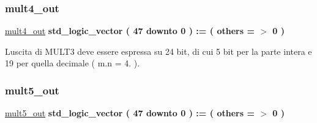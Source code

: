 \subsubsection{\texorpdfstring{mult4\+\_\+out}{mult4\_out}}
{\footnotesize\ttfamily \hyperlink{group___linear_regression_ga5a0832f93305c3e0a37293a00e17a538}{mult4\+\_\+out} {\bfseries \textcolor{vhdlchar}{std\+\_\+logic\+\_\+vector}\textcolor{vhdlchar}{ }\textcolor{vhdlchar}{(}\textcolor{vhdlchar}{ }\textcolor{vhdlchar}{ } \textcolor{vhdldigit}{47} \textcolor{vhdlchar}{ }\textcolor{vhdlchar}{downto}\textcolor{vhdlchar}{ }\textcolor{vhdlchar}{ } \textcolor{vhdldigit}{0} \textcolor{vhdlchar}{ }\textcolor{vhdlchar}{)}\textcolor{vhdlchar}{ }\textcolor{vhdlchar}{ }\textcolor{vhdlchar}{ }\textcolor{vhdlchar}{\+:}\textcolor{vhdlchar}{=}\textcolor{vhdlchar}{ }\textcolor{vhdlchar}{(}\textcolor{vhdlchar}{ }\textcolor{vhdlchar}{ }\textcolor{vhdlchar}{others}\textcolor{vhdlchar}{ }\textcolor{vhdlchar}{ }\textcolor{vhdlchar}{=}\textcolor{vhdlchar}{ }\textcolor{vhdlchar}{$>$}\textcolor{vhdlchar}{ }\textcolor{vhdlchar}{\textquotesingle{}}\textcolor{vhdlchar}{ } \textcolor{vhdldigit}{0} \textcolor{vhdlchar}{ }\textcolor{vhdlchar}{\textquotesingle{}}\textcolor{vhdlchar}{ }\textcolor{vhdlchar}{)}\textcolor{vhdlchar}{ }} \hspace{0.3cm}{\ttfamily [Signal]}}

L\textquotesingle{}uscita di M\+U\+L\+T3 deve essere espressa su 24 bit, di cui 5 bit per la parte intera e 19 per quella decimale ( m.\+n = 4. ). \mbox{\label{group___linear_regression_ga308e89f3c1df2b63a7dad6d0efa94e66}} 
\subsubsection{\texorpdfstring{mult5\+\_\+out}{mult5\_out}}
{\footnotesize\ttfamily \hyperlink{group___linear_regression_ga308e89f3c1df2b63a7dad6d0efa94e66}{mult5\+\_\+out} {\bfseries \textcolor{vhdlchar}{std\+\_\+logic\+\_\+vector}\textcolor{vhdlchar}{ }\textcolor{vhdlchar}{(}\textcolor{vhdlchar}{ }\textcolor{vhdlchar}{ } \textcolor{vhdldigit}{47} \textcolor{vhdlchar}{ }\textcolor{vhdlchar}{downto}\textcolor{vhdlchar}{ }\textcolor{vhdlchar}{ } \textcolor{vhdldigit}{0} \textcolor{vhdlchar}{ }\textcolor{vhdlchar}{)}\textcolor{vhdlchar}{ }\textcolor{vhdlchar}{ }\textcolor{vhdlchar}{ }\textcolor{vhdlchar}{\+:}\textcolor{vhdlchar}{=}\textcolor{vhdlchar}{ }\textcolor{vhdlchar}{(}\textcolor{vhdlchar}{ }\textcolor{vhdlchar}{ }\textcolor{vhdlchar}{others}\textcolor{vhdlchar}{ }\textcolor{vhdlchar}{ }\textcolor{vhdlchar}{=}\textcolor{vhdlchar}{ }\textcolor{vhdlchar}{$>$}\textcolor{vhdlchar}{ }\textcolor{vhdlchar}{\textquotesingle{}}\textcolor{vhdlchar}{ } \textcolor{vhdldigit}{0} \textcolor{vhdlchar}{ }\textcolor{vhdlchar}{\textquotesingle{}}\textcolor{vhdlchar}{ }\textcolor{vhdlchar}{)}\textcolor{vhdlchar}{ }} \hspace{0.3cm}{\ttfamily [Signal]}}

